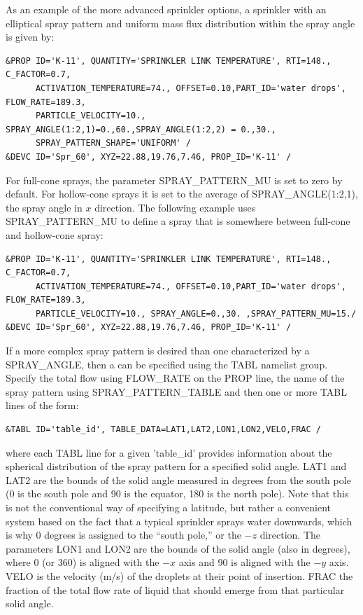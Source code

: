 \documentclass[11pt]{book}
\begin{document}
As an example of the more advanced sprinkler options, a sprinkler with an elliptical spray pattern and uniform mass flux distribution within the spray angle is given by:
\begin{lstlisting}
&PROP ID='K-11', QUANTITY='SPRINKLER LINK TEMPERATURE', RTI=148., C_FACTOR=0.7,
      ACTIVATION_TEMPERATURE=74., OFFSET=0.10,PART_ID='water drops', FLOW_RATE=189.3,
      PARTICLE_VELOCITY=10., SPRAY_ANGLE(1:2,1)=0.,60.,SPRAY_ANGLE(1:2,2) = 0.,30.,
      SPRAY_PATTERN_SHAPE='UNIFORM' /
&DEVC ID='Spr_60', XYZ=22.88,19.76,7.46, PROP_ID='K-11' /
\end{lstlisting}
For full-cone sprays, the parameter {\ct SPRAY\_PATTERN\_MU} is set to zero by default. For hollow-cone sprays it is set to the average of {\ct SPRAY\_ANGLE(1:2,1)}, the spray angle in $x$ direction. The following example uses  {\ct SPRAY\_PATTERN\_MU} to define a spray that is somewhere between full-cone and hollow-cone spray:
\begin{lstlisting}
&PROP ID='K-11', QUANTITY='SPRINKLER LINK TEMPERATURE', RTI=148., C_FACTOR=0.7,
      ACTIVATION_TEMPERATURE=74., OFFSET=0.10,PART_ID='water drops', FLOW_RATE=189.3,
      PARTICLE_VELOCITY=10., SPRAY_ANGLE=0.,30. ,SPRAY_PATTERN_MU=15./
&DEVC ID='Spr_60', XYZ=22.88,19.76,7.46, PROP_ID='K-11' /
\end{lstlisting}
If a more complex spray pattern is desired than one characterized by a {\ct SPRAY\_ANGLE}, then a  can be specified using the {\ct TABL} namelist group. Specify the total flow using {\ct FLOW\_RATE} on the {\ct PROP} line, the name of the spray pattern using {\ct SPRAY\_PATTERN\_TABLE} and then one or more {\ct TABL} lines of the form:
\begin{lstlisting}
&TABL ID='table_id', TABLE_DATA=LAT1,LAT2,LON1,LON2,VELO,FRAC /
\end{lstlisting}
where each {\ct TABL} line for a given {\ct 'table\_id'} provides information about the spherical distribution of the spray pattern
for a specified solid angle. {\ct LAT1} and {\ct LAT2} are the bounds of the solid angle measured in degrees from
the south pole (0 is the south pole and 90 is the equator, 180 is the north pole).  Note that this is not the conventional way of
specifying a latitude, but rather a convenient system based on the fact that a typical sprinkler sprays water downwards, which is
why 0 degrees is assigned to the ``south pole,'' or the $-z$ direction. The parameters {\ct LON1} and {\ct LON2} are the
bounds of the solid angle (also in degrees),
where 0 (or 360) is aligned with the $-x$ axis and 90 is aligned with the $-y$ axis.  {\ct VELO} is the velocity (m/s) of the droplets at their
point of insertion.
{\ct FRAC} the fraction of the total flow rate of liquid that should emerge from that particular solid angle.
\end{document}
